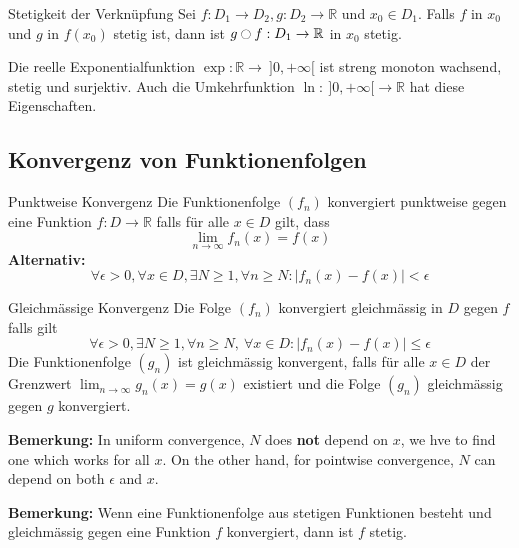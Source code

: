 \documentclass[a4paper,8pt]{extarticle}
\newenvironment{bemerkung}{
   \noindent \textbf{Bemerkung:  }}{}
\def\limn{\lim_{n\to \infty}}
\def\R{\mathbb{R}}
\begin{document}
\begin{subbox}{Stetigkeit der Verknüpfung}
  Sei $f: D_1 \to D_2, g: D_2 \to \R$ und $x_0 \in D_1$. Falls $f$ in $x_0$ und $g$ in $f(x_0)$ stetig ist, dann ist $g \ocircle f: D_1 \to \R$ in $x_0$ stetig.
 \end{subbox}

\begin{subbox}{Die reelle Exponentialfunktion}
 $\exp: \R \to \ ]0,+\infty[$ ist streng monoton wachsend, stetig und surjektiv. Auch die Umkehrfunktion $\ln: \ ]0,+\infty[ \to \R$ hat diese Eigenschaften.
\end{subbox}

\subsection{Konvergenz von Funktionenfolgen}

\begin{mainbox}{Punktweise Konvergenz}
  Die Funktionenfolge $(f_n)$ konvergiert punktweise gegen eine Funktion $f: D \to \R$ falls für alle $x \in D$ gilt, dass $$\limn f_n(x) = f(x)$$
  \textbf{Alternativ:} $$\forall \epsilon > 0, \forall x \in D, \exists N \geq 1, \forall n \geq N: |f_n(x) - f(x)| < \epsilon$$
\end{mainbox}

\begin{mainbox}{Gleichmässige Konvergenz}
 Die Folge $(f_n)$ konvergiert gleichmässig in $D$ gegen $f$ falls gilt $$\forall \epsilon > 0, \exists N \ge 1, \forall n \ge N, \ \forall x \in D: | f_n(x) - f(x) | \le \epsilon$$
 Die Funktionenfolge $(g_n)$ ist gleichmässig konvergent, falls für alle $x\in D$ der Grenzwert $\limn g_n(x) = g(x)$ existiert und die Folge $(g_n)$ gleichmässig gegen $g$ konvergiert.
\end{mainbox}

\begin{bemerkung}
  In uniform convergence, $N$ does \textbf{not} depend on $x$, we hve to find one which works for all $x$. On the other hand, for pointwise convergence, $N$ can depend on both $\epsilon$ and $x$.
\end{bemerkung}

\begin{bemerkung}
  Wenn eine Funktionenfolge aus stetigen Funktionen besteht und gleichmässig gegen eine Funktion $f$ konvergiert, dann ist $f$ stetig.
\end{bemerkung}
\end{document}

